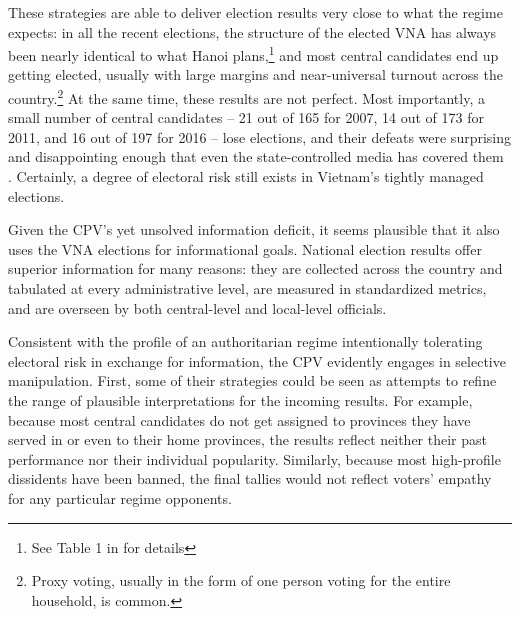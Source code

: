 \documentclass[12pt]{article}
\newcommand\fnote[1]{\footnote{\baselineskip=2\normalbaselineskip#1}}
\newcommand{\1}{\mathbbm{1}}
\begin{document}
These strategies are able to deliver election results very close to what the regime expects: in all the recent elections, the structure of the elected VNA has always been nearly identical to what Hanoi plans,\fnote{See Table 1 in \citet[][506]{MaleskySchuler2011} for details} and most central candidates end up getting elected, usually with large margins and near-universal turnout across the country.\fnote{Proxy voting, usually in the form of one person voting for the entire household, is common.} At the same time, these results are not perfect. Most importantly, a small number of central candidates -- 21 out of 165 for 2007, 14 out of 173 for 2011, and 16 out of 197 for 2016 -- lose elections, and their defeats were surprising and disappointing enough that even the state-controlled media has covered them \citep[e.g.][]{vov2016}. Certainly, a degree of electoral risk still exists in Vietnam's tightly managed elections.%

Given the CPV's yet unsolved information deficit, it seems plausible that it also uses the VNA elections for informational goals. National election results offer superior information for many reasons: they are collected across the country and tabulated at every administrative level, are measured in standardized metrics, and are overseen by both central-level and local-level officials.

Consistent with the profile of an authoritarian regime intentionally tolerating electoral risk in exchange for information, the CPV evidently engages in selective manipulation. First, some of their strategies could be seen as attempts to refine the range of plausible interpretations for the incoming results. For example, because most central candidates do not get assigned to provinces they have served in or even to their home provinces, the results reflect neither their past performance nor their individual popularity. Similarly, because most high-profile dissidents have been banned, the final tallies would not reflect voters' empathy for any particular regime opponents.
\end{document}
